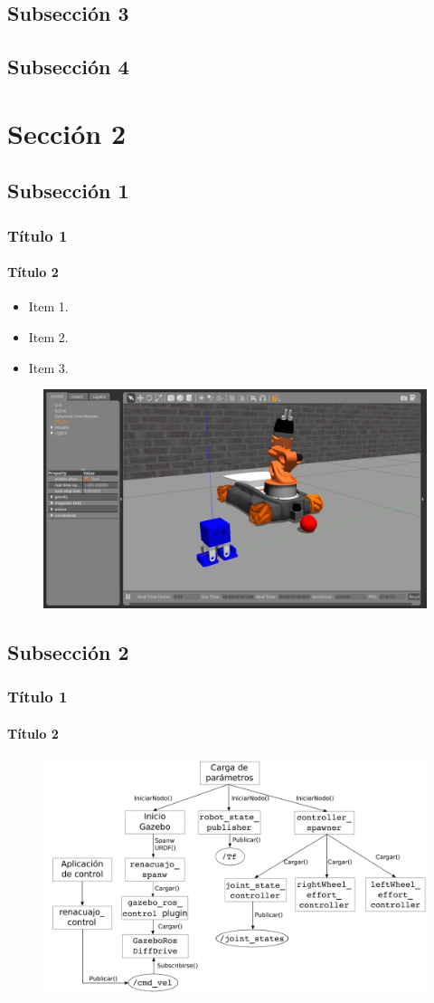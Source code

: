 \documentclass{beamer}
\begin{document}
\subsection{Subsección 3}
\subsection{Subsección 4}

\section{Sección 2}
\subsection{Subsección 1}
\begin{frame}
	\frametitle{Título 1}
	\framesubtitle{Título 2}
	\begin{itemize}
		\item Item 1.
		\item Item 2.
		\item Item 3.
	\end{itemize}
	
	\begin{figure}[htb]
		\centering
		\includegraphics[width = 0.6\linewidth]{imagenes/gaz2.png}
	\end{figure}
\end{frame}

\subsection{Subsección 2}
\begin{frame}
	\frametitle{Título 1}
	\framesubtitle{Título 2}

	\begin{figure}[htb]
		\centering
		\includegraphics[width = 1\linewidth]{imagenes/sim_renacuajo.pdf}
	\end{figure}
\end{frame}
\end{document}
